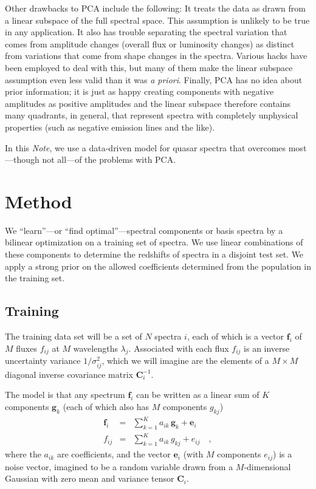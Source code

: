 \documentclass[apj]{emulateapj}
\newcommand{\foreign}[1]{\textit{#1}}
\newcommand{\mmatrix}[1]{\boldsymbol{#1}}
\newcommand{\inverse}[1]{{#1}^{-1}}
\newcommand{\covar}{\mmatrix{C}}
\newcommand{\evec}{\mmatrix{e}}
\newcommand{\fvec}{\mmatrix{f}}
\newcommand{\gvec}{\mmatrix{g}}
\newcommand{\invvar}{\inverse{\covar}}
\newcommand{\documentname}{\textsl{Note}}
\begin{document}
Other drawbacks to PCA include the following: It treats the data as
drawn from a linear subspace of the full spectral space.  This
assumption is unlikely to be true in any application.  It also has
trouble separating the spectral variation that comes from amplitude
changes (overall flux or luminosity changes) as distinct from
variations that come from shape changes in the spectra.  Various hacks
have been employed to deal with this, but many of them make the linear
subspace assumption even less valid than it was \foreign{a priori}.
Finally, PCA has no idea about prior information; it is just as happy
creating components with negative amplitudes as positive amplitudes
and the linear subspace therefore contains many quadrants, in general,
that represent spectra with completely unphysical properties (such as
negative emission lines and the like).

In this \documentname, we use a data-driven model for quasar spectra
that overcomes most---though not all---of the problems with PCA.

\section{Method}

We ``learn''---or ``find optimal''---spectral components or basis
spectra by a bilinear optimization on a training set of spectra.  We
use linear combinations of these components to determine the redshifts
of spectra in a disjoint test set.  We apply a strong prior on the
allowed coefficients determined from the population in the training
set.

\subsection{Training}

The training data set will be a set of $N$ spectra $i$, each of which
is a vector $\fvec_i$ of $M$ fluxes $f_{ij}$ at $M$ wavelengths
$\lambda_j$.  Associated with each flux $f_{ij}$ is an inverse
uncertainty variance $1/\sigma^2_{ij}$, which we will imagine are the
elements of a $M\times M$ diagonal inverse covariance matrix
$\invvar_{i}$.

The model is that any spectrum $\fvec_i$ can be written as a linear
sum of $K$ components $\gvec_k$ (each of which also has $M$ components
$g_{kj}$)
\begin{eqnarray}\displaystyle
\fvec_i &=& \sum_{k=1}^K a_{ik}\,\gvec_k + \evec_i \nonumber\\
f_{ij} &=& \sum_{k=1}^K a_{ik}\,g_{kj} + e_{ij}
\quad ,
\end{eqnarray}
where the $a_{ik}$ are coefficients, and the vector $\evec_i$ (with
$M$ components $e_{ij}$) is a noise vector, imagined to be a random
variable drawn from a $M$-dimensional Gaussian with zero mean and
variance tensor $\covar_i$.
\end{document}

